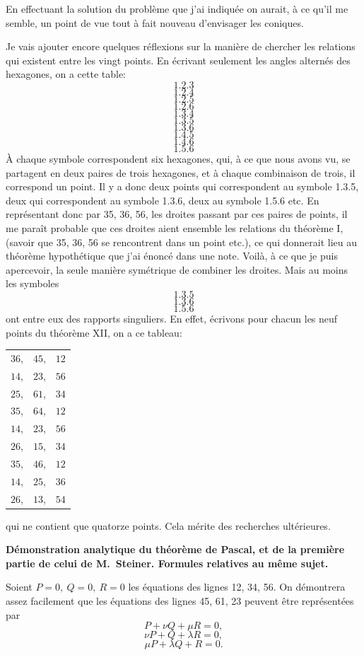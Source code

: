 \documentclass[12pt,a4paper]{article}
\begin{document}
En effectuant la solution du probl\`eme que j'ai indiqu\'ee on aurait, \`a ce qu'il me semble, un point de vue tout \`a fait nouveau d'envisager les coniques.

Je vais ajouter encore quelques r\'eflexions sur la mani\`ere de chercher les relations qui existent entre les vingt points. En \'ecrivant seulement les angles altern\'es des hexagones, on a cette table:
\[
1.2.3
\]
\[
1.2.4
\]
\[
1.2.5
\]
\[
1.2.6
\]
\[
1.3.4
\]
\[
1.3.5
\]
\[
1.3.6
\]
\[
1.4.5
\]
\[
1.4.6
\]
\[
1.5.6
\]
\`A chaque symbole correspondent six hexagones, qui, \`a ce que nous avons vu, se partagent en deux paires de trois hexagones, et \`a chaque combinaison de trois, il correspond un point. Il y a donc deux points qui correspondent au symbole 1.3.5, deux qui correspondent au symbole 1.3.6, deux au symbole 1.5.6 etc. En repr\'esentant donc par 35, 36, 56, les droites passant par ces paires de points, il me para\^it probable que ces droites aient ensemble les relations du th\'eor\`eme I, (savoir que 35, 36, 56 se rencontrent dans un point etc.), ce qui donnerait lieu au th\'eor\`eme hypoth\'etique que j'ai \'enonc\'e dans une note. Voil\`a, \`a ce que je puis apercevoir, la seule mani\`ere sym\'etrique de combiner les droites. Mais au moins les symboles
\[
1.3.5
\]
\[
1.3.6
\]
\[
1.5.6
\]
ont entre eux des rapports singuliers. En effet, \'ecrivons pour chacun les neuf points du th\'eor\`eme XII, on a ce tableau:
\begin{center}
\begin{tabular}{l l l}
$36$, & $45$, & $12$\\
$14$, & $23$, & $56$\\
$25$, & $61$, & $34$\\[3pt]
$35$, & $64$, & $12$\\
$14$, & $23$, & $56$\\
$26$, & $15$, & $34$\\[3pt]
$35$, & $46$, & $12$\\
$14$, & $25$, & $36$\\
$26$, & $13$, & $54$\\
\end{tabular}
\end{center}
qui ne contient que quatorze points. Cela m\'erite des recherches ult\'erieures.

\medskip
\noindent\textbf{D\'emonstration analytique du th\'eor\`eme de Pascal, et de la premi\`ere partie de celui de M.~Steiner. Formules relatives au m\^eme sujet.}
\medskip

Soient $P = 0,\ Q = 0,\ R = 0$ les \'equations des lignes 12, 34, 56. On d\'emontrera assez facilement que les \'equations des lignes 45, 61, 23 peuvent \^etre repr\'esent\'ees par
\[
P + \nu Q + \mu R = 0,
\]
\[
\nu P + Q + \lambda R = 0,
\]
\[
\mu P + \lambda Q + R = 0.
\]
\end{document}
